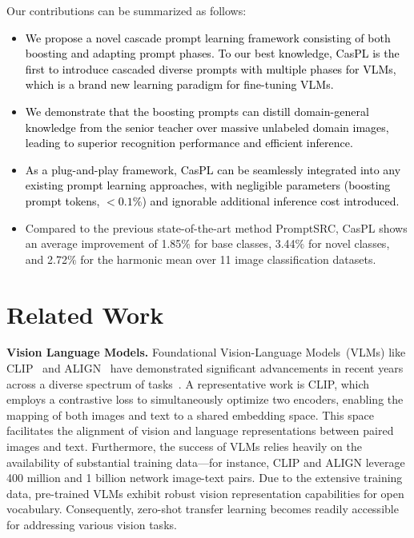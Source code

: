 \documentclass[runningheads]{llncs}
\newcommand{\implus}[1]{\textcolor{black}{#1}}
\newcommand{\rewrite}[1]{\textcolor{black}{#1}}%
\newcommand{\lz}[1]{\textcolor{black}{#1}}
\begin{document}
Our contributions can be summarized as follows:
\begin{itemize}[leftmargin=20pt]\setlength{\itemsep}{5pt}
    \item \implus{We propose a novel \lz{cascade prompt learning framework consisting of both boosting and adapting prompt phases. 
    To our best knowledge,}
    CasPL is the first to introduce cascaded diverse prompts with multiple phases for VLMs, which is a brand new learning paradigm for fine-tuning VLMs.}

    \item \implus{We demonstrate that the boosting prompts can distill domain-general knowledge from the senior teacher over massive unlabeled domain images, leading to superior recognition performance and \rewrite{efficient inference.}}

    \item \implus{As a plug-and-play framework, CasPL can be seamlessly integrated into any existing prompt learning approaches, with negligible parameters (boosting prompt tokens, {$<0.1\%$}) and ignorable additional inference cost introduced.}

    \item Compared to the previous state-of-the-art method PromptSRC, CasPL shows an average improvement of 1.85$\%$ for base classes, 3.44$\%$ for novel classes, and 2.72$\%$ for the harmonic mean over 11 image classification datasets. 
\end{itemize}












\section{Related Work}
\textbf{Vision Language Models.}
Foundational Vision-Language Models~(VLMs) like CLIP~\cite{radford2021learning} and ALIGN~\cite{jia2021scaling} have demonstrated significant advancements in recent years across a diverse spectrum of tasks~\cite{luddecke2022image, yu2023turning, zhong2022regionclip, gu2021open, ding2022decoupling, gao2023clip, zhang2021tip}. 
A representative work is CLIP, which employs a contrastive loss to simultaneously optimize two encoders, enabling the mapping of both images and text to a shared embedding space. This space facilitates the alignment of vision and language representations between paired images and text. 
Furthermore, the success of VLMs relies heavily on the availability of substantial training data—for instance, CLIP and ALIGN leverage 400 million and 1 billion network image-text pairs. Due to the extensive training data, pre-trained VLMs exhibit robust vision representation capabilities for open vocabulary. 
Consequently, zero-shot transfer learning becomes readily accessible for addressing various vision tasks.
\end{document}
